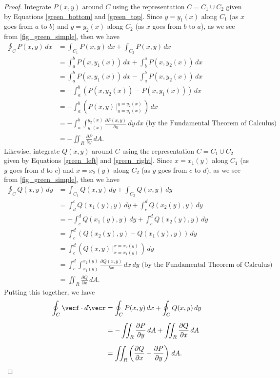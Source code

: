 \begin{proof}
 Integrate $P(x,y)$ around $C$ using the representation $C = C_1 \cup C_2$ given by Equations \eqref{green_bottom} and \eqref{green_top}. Since $y = y_1(x)$ along $C_1$ (as $x$ goes from $a$ to $b$) and $y = y_2(x)$ along $C_2$ (as $x$ goes from $b$ to $a$), as we see from \autoref{fig_green_simple}, then we have
 \begin{align*}
  \oint_C P(x,y)\,dx &= \int_{C_1} P(x,y)\,dx + \int_{C_2} P(x,y)\,dx\\
   &= \int_a^b P(x,y_1(x))\,dx + \int_b^a P(x,y_2(x))\,dx\\
   &= \int_a^b P(x,y_1(x))\,dx - \int_a^b P(x,y_2(x))\,dx\\[6pt]
   &= -\int_a^b \left( P(x,y_2(x)) - P(x,y_1(x)) \right)\,dx\\[6pt]
   &= -\int_a^b \left( P(x,y) \,\Big|_{y = y_1(x)}^{y = y_2(x)} \,\right)\,dx\\[6pt]
   &= -\int_a^b \int_{y_1(x)}^{y_2(x)} \frac{\partial P(x,y)}{\partial y}\,dy\,dx \text{ (by the Fundamental Theorem of Calculus)}\\[6pt]
   &= -\iint_{R} \frac{\partial P}{\partial y}\,dA .
 \end{align*}
 Likewise, integrate $Q(x,y)$ around $C$ using the representation $C = C_1 \cup C_2$ given by Equations \eqref{green_left} and \eqref{green_right}. Since $x = x_1(y)$ along $C_1$ (as $y$ goes from $d$ to $c$) and $x = x_2(y)$ along $C_2$ (as $y$ goes from $c$ to $d$), as we see from \autoref{fig_green_simple}, then we have
 \begin{align*}
  \oint_C Q(x,y)\,dy &= \int_{C_1} Q(x,y)\,dy + \int_{C_2} Q(x,y)\,dy\\
   &= \int_d^c Q(x_1(y),y)\,dy + \int_c^d Q(x_2(y),y)\,dy\\
   &= -\int_c^d Q(x_1(y),y)\,dy + \int_c^d Q(x_2(y),y)\,dy\\[6pt]
   &= \int_c^d \left( Q(x_2(y),y) - Q(x_1(y),y) \right)\,dy\\[6pt]
   &= \int_c^d \left( Q(x,y) \,\Big|_{x = x_1(y)}^{x = x_2(y)} \,\right)\,dy\\[6pt]
   &= \int_c^d \int_{x_1(y)}^{x_2(y)} \frac{\partial Q(x,y)}{\partial x}\,dx\,dy \text{ (by the Fundamental Theorem of Calculus)}\\[6pt]
   &= \iint_{R} \frac{\partial Q}{\partial x}\,dA .
 \end{align*}
Putting this together, we have
 \begin{align*}
  \oint_{C}\vecf\cdot d\vecr &= \oint_C P(x,y)\,dx + \oint_C Q(x,y)\,dy\\[6pt]
   &= -\iint_{R} \frac{\partial P}{\partial y}\,dA + \iint_{R} \frac{\partial Q}{\partial x}\,dA\\[6pt]
   &= \iint_{R} \left( \frac{\partial Q}{\partial x} - \frac{\partial P}{\partial y} \right)\,dA .\qedhere
 \end{align*}
\end{proof}

